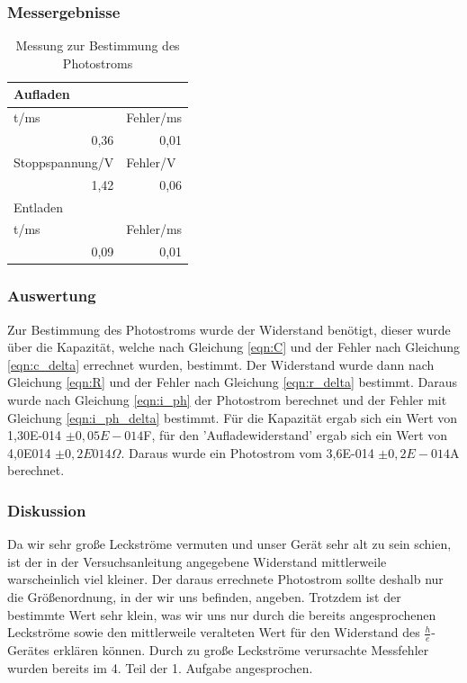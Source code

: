 \documentclass[12px]{scrartcl}
\begin{document}
\subsubsection{Messergebnisse}
\begin{table}[htbp]
\caption{Messung zur Bestimmung des Photostroms}
\begin{center}
\begin{tabular}{|l|l|}
\hline
Aufladen &  \\ \hline
t/ms & Fehler/ms \\ \hline
\multicolumn{1}{|r|}{0,36} & \multicolumn{1}{r|}{0,01} \\ \hline
Stoppspannung/V & Fehler/V \\ \hline
\multicolumn{1}{|r|}{1,42} & \multicolumn{1}{r|}{0,06} \\ \hline
Entladen &  \\ \hline
t/ms & Fehler/ms \\ \hline
\multicolumn{1}{|r|}{0,09} & \multicolumn{1}{r|}{0,01} \\ \hline
\end{tabular}
\end{center}
\label{tab:a_2.1}
\end{table}


\subsubsection{Auswertung}
Zur Bestimmung des Photostroms wurde der Widerstand benötigt, dieser wurde über die Kapazität, welche nach Gleichung \ref{eqn:C} und der Fehler nach Gleichung \ref{eqn:c_delta} errechnet wurden, bestimmt. Der Widerstand wurde dann nach Gleichung \ref{eqn:R} und der Fehler nach Gleichung \ref{eqn:r_delta} bestimmt. Daraus wurde nach Gleichung \ref{eqn:i_ph} der Photostrom berechnet und der Fehler mit Gleichung \ref{eqn:i_ph_delta} bestimmt. Für die Kapazität ergab sich ein Wert von 1,30E-014	$\pm 0,05E-014$F, für den 'Aufladewiderstand' ergab sich ein Wert von 4,0E014 $\pm 0,2E014 \Omega$. Daraus wurde ein Photostrom vom 3,6E-014 $\pm 0,2E-014$A berechnet.

\subsubsection{Diskussion}
Da wir sehr große Leckströme vermuten und unser Gerät sehr alt zu sein schien, ist der in der Versuchsanleitung angegebene Widerstand  mittlerweile warscheinlich viel kleiner. Der daraus errechnete Photostrom sollte deshalb nur die Größenordnung, in der wir uns befinden, angeben. Trotzdem ist der bestimmte Wert sehr klein, was wir uns nur durch die bereits angesprochenen Leckströme sowie den mittlerweile veralteten Wert für den Widerstand des $\frac{h}{e}$-Gerätes erklären können. Durch zu große Leckströme verursachte Messfehler wurden bereits im 4. Teil der 1. Aufgabe angesprochen.
\end{document}
